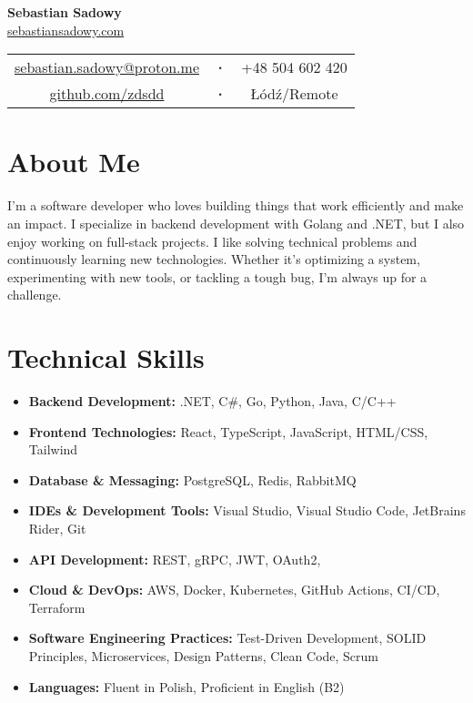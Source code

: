 \documentclass[a4paper,10pt]{article}
\begin{document}
\begin{center}
    {\Huge\textbf{Sebastian Sadowy}} \\[0.3cm]
    \href{https://sebastiansadowy.com}{sebastiansadowy.com} \\[0.2cm]
    \begin{tabular}{c c c}
        \href{mailto:sebastian.sadowy@proton.me}{sebastian.sadowy@proton.me} & 
        \textbf{·} & 
        +48 504 602 420 \\
        \href{https://github.com/zdsdd}{github.com/zdsdd} &
        \textbf{·} &
        Łódź/Remote
    \end{tabular}
\end{center}


\section{About Me}
I’m a software developer who loves building things that work efficiently and make an impact. I specialize in backend development with Golang and .NET, but I also enjoy working on full-stack projects. I like solving technical problems and continuously learning new technologies. Whether it’s optimizing a system, experimenting with new tools, or tackling a tough bug, I’m always up for a challenge.

\section{Technical Skills}
\begin{itemize}[leftmargin=0.5cm, itemsep=4pt]
    \item \textbf{Backend Development:} .NET, C\#, Go, Python, Java, C/C++
    \item \textbf{Frontend Technologies:} React, TypeScript, JavaScript, HTML/CSS, Tailwind
    \item \textbf{Database \& Messaging:} PostgreSQL, Redis, RabbitMQ
    \item \textbf{IDEs \& Development Tools:} Visual Studio, Visual Studio Code, JetBrains Rider, Git
    \item \textbf{API Development:} REST, gRPC, JWT, OAuth2,
    \item \textbf{Cloud \& DevOps:} AWS, Docker, Kubernetes, GitHub Actions, CI/CD, Terraform
    \item \textbf{Software Engineering Practices:} Test-Driven Development, SOLID Principles, Microservices, Design Patterns, Clean Code, Scrum
    \item \textbf{Languages:} Fluent in Polish, Proficient in English (B2)
\end{itemize}
\end{document}

